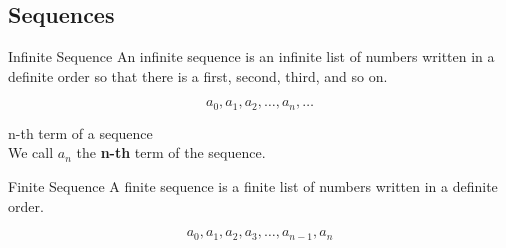 \subsection{Sequences}

\begin{defn}{Infinite Sequence}
An infinite sequence is an infinite list of numbers written in a definite order so that there is a first, second, third, and so on.
\end{defn}

\smallskip

\begin{nota}
\[ a_{0}, a_{1}, a_{2}, \ldots, a_{n}, \ldots \]
\end{nota}

\smallskip

\begin{defn}{n-th term of a sequence} \\
We call $a_{n}$ the \textbf{n-th} term of the sequence.
\end{defn}

\medskip

\begin{defn}{Finite Sequence} 
A finite sequence is a finite list of numbers written in a definite order.
\end{defn}

\smallskip

\begin{nota}
\[ a_{0}, a_{1}, a_{2}, a_{3}, \ldots, a_{n-1}, a_{n} \]
\end{nota}

\medskip


